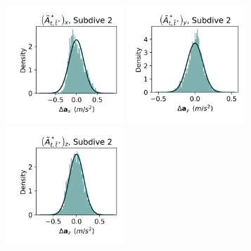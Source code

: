 \documentclass{article}
\begin{document}
\begin{center}
        \includegraphics[width=1.75in]{../Plots/2019/20190902-182840-CATs_OB_1_0_267_HHMM_empirical_hist_Ax_1.png}
        \includegraphics[width=1.75in]{../Plots/2019/20190902-182840-CATs_OB_1_0_267_HHMM_empirical_hist_Ay_1.png}
        \includegraphics[width=1.75in]{../Plots/2019/20190902-182840-CATs_OB_1_0_267_HHMM_empirical_hist_Az_1.png}
        

\end{center}
\end{document}
